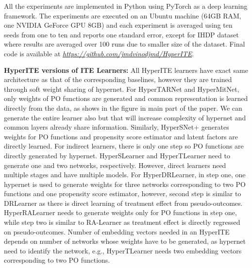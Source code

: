 \documentclass{article}
\begin{document}
All the experiments are implemented in Python using PyTorch as a deep learning framework. The experiments are executed on an Ubuntu machine (64GB RAM, one NVIDIA GeForce GPU 8GB) and each experiment is averaged using ten seeds from one to ten and reports one standard error, except for IHDP dataset where results are averaged over 100 runs due to smaller size of the dataset. Final code is available at \textit{\url{https://github.com/jmdvinodjmd/HyperITE}}.

\textbf{HyperITE versions of ITE Learners:} All HyperITE learners have exact same architecture as that of the corresponding baselines, however they are trained through soft weight sharing of hypernet. For HyperTARNet and HyperMitNet, only weights of PO functions are generated and common representation is learned directly from the data, as shows in the figure in main part of the paper. We can generate the entire learner also but that will increase complexity of hypernet and common layers already share information. Similarly, HyperSNet+ generates weights for PO functions and propensity score estimator and latent factors are directly learned. For indirect learners, there is only one step so PO functions are directly generated by hypernet. HyperSLearner and HyperTLearner need to generate one and two networks, respectively. However, direct learners need multiple stages and have multiple models. For HyperDRLearner, in step one, one hypernet is used to generate weights for three networks corresponding to two PO functions and one propensity score estimator, however, second step is similar to DRLearner as there is direct learning of treatment effect from pseudo-outcomes. HyperRALearner needs to generate weights only for PO functions in step one, while step two is similar to RA-Learner as treatment effect is directly regressed on pseudo-outcomes. Number of embedding vectors needed in an HyperITE depends on number of networks whose weights have to be generated, as hypernet need to identify the network, e.g., HyperTLearner needs two embedding vectors corresponding to two PO functions.

\end{document}
